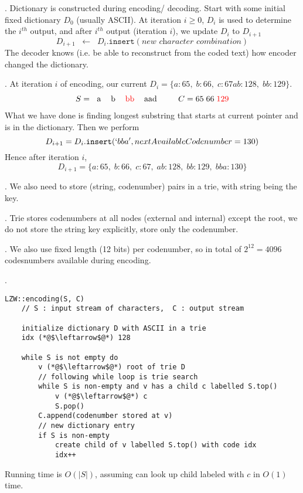 \documentclass{article}
\begin{document}
\begin{comm}[].
    Dictionary is constructed during encoding/ decoding. Start with some initial fixed dictionary $D_0$ (usually ASCII). At iteration $i \geq 0$, $D_i$ is used to determine the $i^{th}$ output, and after $i^{th}$ output (iteration $i$), we update $D_i$ to $D_{i+1}$ 
    \[ D_{i + 1} \;\;\leftarrow\;\; D_i.\texttt{insert}(\textit{new character combination}) \]
    The decoder knows (i.e. be able to reconstruct from the coded text) how encoder changed the dictionary. 
\end{comm}

\begin{examplee}.
    At iteration $i$ of encoding, our current $D_i = \{a:65, \; b: 66, \; c:67 ab:128, \; bb:129\}$. 
    \[ S = \begin{tabular}{ccccccc}
        a & b & \textcolor{red}{bb} & aad
    \end{tabular} \qquad C = 65 \; 66 \; \textcolor{red}{129} \]
    What we have done is finding longest substring that starts at current pointer and is in the dictionary. Then we perform 
    \[ D_{i+1} = D_i.\texttt{insert}(`bba', nextAvailableCodenumber = 130) \]
    Hence after iteration $i$, 
    \[ D_{i+1} = \{a:65, \; b:66, \; c:67, \; ab:128, \; bb: 129, \; bba:130 \} \]
\end{examplee}

\begin{algo}[].
    We also need to store (string, codenumber) pairs in a trie, with string being the key. 
    \begin{comm}[].
        Trie stores codenumbers at all nodes (external and internal) except the root, we do not store the string key explicitly, store only the codenumber. 
    \end{comm}
\end{algo}

\begin{thmm}[].
    We also use fixed length (12 bits) per codenumber, so in total of $2^{12} = 4096$ codesnumbers available during encoding. 
\end{thmm}

\begin{codes}[].
    \begin{lstlisting}[style=cppstyle]
    LZW::encoding(S, C)
    // S : input stream of characters,  C : output stream
    
    initialize dictionary D with ASCII in a trie
    idx (*@$\leftarrow$@*) 128
    
    while S is not empty do
        v (*@$\leftarrow$@*) root of trie D
        // following while loop is trie search
        while S is non-empty and v has a child c labelled S.top() 
            v (*@$\leftarrow$@*) c 
            S.pop() 
        C.append(codenumber stored at v)
        // new dictionary entry
        if S is non-empty 
            create child of v labelled S.top() with code idx
            idx++ 
    \end{lstlisting}
    Running time is $O(|S|)$, assuming can look up child labeled with $c$ in $O(1)$ time. 
\end{codes}
\end{document}
